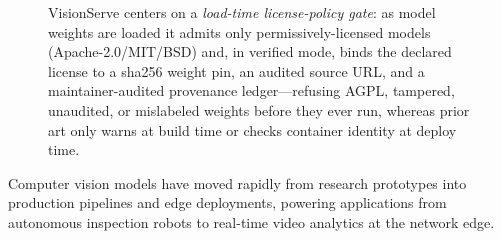 \begin{figure}[t]
\caption{VisionServe centers on a \emph{load-time license-policy gate}: as model weights are
loaded it admits only permissively-licensed models (Apache-2.0/MIT/BSD) and, in verified mode,
binds the declared license to a sha256 weight pin, an audited source URL, and a maintainer-audited
provenance ledger---refusing AGPL, tampered, unaudited, or mislabeled weights before they ever
run, whereas prior art only warns at build time or checks container identity at deploy time.}
\label{fig:teaser}
\end{figure}

Computer vision models have moved rapidly from research prototypes into production pipelines
and edge deployments, powering applications from autonomous inspection robots to real-time
video analytics at the network edge.

